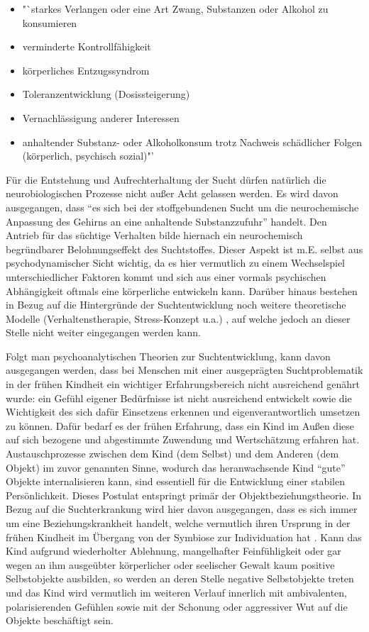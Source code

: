 \begin{itemize}
\item "`starkes Verlangen oder eine Art Zwang, Substanzen oder Alkohol zu konsumieren
\item verminderte Kontrollfähigkeit
\item körperliches Entzugssyndrom
\item Toleranzentwicklung (Dosissteigerung)
\item Vernachlässigung anderer Interessen
\item anhaltender Substanz- oder Alkoholkonsum trotz Nachweis schädlicher Folgen (körperlich, psychisch sozial)"' \autocite[315]{moeller2009}
\end{itemize}

Für die Entstehung und Aufrechterhaltung der Sucht dürfen natürlich die neurobiologischen Prozesse nicht außer Acht gelassen werden. Es wird davon ausgegangen, dass "`es sich bei der stoffgebundenen Sucht um die neurochemische Anpassung des Gehirns an eine anhaltende Substanzzufuhr"' \autocite[14]{tretter2008} handelt. Den Antrieb für das süchtige Verhalten bilde hiernach ein neurochemisch begründbarer Belohnungseffekt des Suchtstoffes. Dieser Aspekt ist m.E. selbst aus psychodynamischer Sicht wichtig, da es hier vermutlich zu einem Wechselspiel unterschiedlicher Faktoren kommt und sich aus einer vormals psychischen Abhängigkeit oftmals eine körperliche entwickeln kann.
Darüber hinaus bestehen in Bezug auf die Hintergründe der Suchtentwicklung noch weitere theoretische Modelle (Verhaltenstherapie, Stress-Konzept u.a.) \autocite[vgl.][38ff.]{tretter2008}, auf welche jedoch an dieser Stelle nicht weiter eingegangen werden kann.
 
Folgt man psychoanalytischen Theorien zur Suchtentwicklung, kann davon ausgegangen werden, dass bei Menschen mit einer ausgeprägten Suchtproblematik in der frühen Kindheit ein wichtiger Erfahrungsbereich nicht ausreichend genährt wurde: ein Gefühl eigener Bedürfnisse ist nicht ausreichend entwickelt sowie die Wichtigkeit des sich dafür Einsetzens erkennen und eigenverantwortlich umsetzen zu können. Dafür bedarf es der frühen Erfahrung, dass ein Kind im Außen diese auf sich bezogene und abgestimmte Zuwendung und Wertschätzung erfahren hat. Austauschprozesse zwischen dem Kind (dem Selbst) und dem Anderen (dem Objekt) im zuvor genannten Sinne, wodurch das heranwachsende Kind "`gute"' Objekte internalisieren kann, sind essentiell für die Entwicklung einer stabilen Persönlichkeit. Dieses Postulat entspringt primär der Objektbeziehungstheorie. In Bezug auf die Suchterkrankung wird hier davon ausgegangen, dass es sich immer um eine Beziehungskrankheit handelt, welche vermutlich ihren Ursprung in der frühen Kindheit im Übergang von der Symbiose zur Individuation hat \autocite[vgl.][9]{weidlinger2012}. Kann das Kind aufgrund wiederholter Ablehnung, mangelhafter Feinfühligkeit oder gar wegen an ihm ausgeübter körperlicher oder seelischer Gewalt kaum positive Selbstobjekte ausbilden, so werden an deren Stelle negative Selbstobjekte treten und das Kind wird vermutlich im weiteren Verlauf innerlich mit ambivalenten, polarisierenden Gefühlen sowie mit der Schonung oder aggressiver Wut auf die Objekte beschäftigt sein\autocite[vgl.][10]{weidlinger2012}. 

